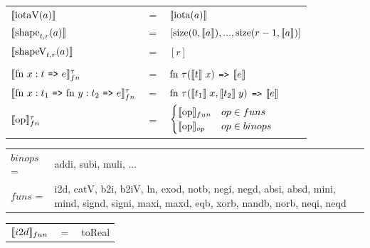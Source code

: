 \documentclass[11pt]{article}
\begin{document}
\begin{flushleft}
\begin{tabular}{@{}l c l}
$\llbracket \text{iotaV}(a) \rrbracket$ & $=$ & $\llbracket \text{iota}(a) \rrbracket$\\

$\llbracket \text{shape}_{t,r}(a) \rrbracket$ & $=$ & $[\text{size}(0,\llbracket a \rrbracket),...,\text{size}(r-1,\llbracket a \rrbracket)]$\\

$\llbracket \text{shapeV}_{t,r}(a) \rrbracket$ & $=$ & $[r]$\\
\\
$\evals{ \text{fn } x:t $ {\tt =>} $ e}^{\tau}_{fn} $ & $=$ & $ \text{fn } \tau (\llbracket t \rrbracket\; x) $ {\tt =>} $ \llbracket e \rrbracket$\\
$\evals{ \text{fn } x:t_1$ {\tt =>} $\text{fn } y:t_2 $ {\tt =>} $ e}^{\tau}_{fn} $ & $=$ & $ \text{fn } \tau (\llbracket t_1 \rrbracket\; x, \llbracket t_2 \rrbracket \; y) $ {\tt =>} $ \llbracket e \rrbracket$\\
$\llbracket \text{op} \rrbracket^{\tau}_{fn}$ & = & $ \begin{cases} \llbracket \text{op} \rrbracket_{fun} & op \in funs \\ \llbracket \text{op} \rrbracket_{op} & op \in binops \end{cases}$
\end{tabular}
\begin{tabu} to \linewidth { l X}
$binops$ =& addi, subi, muli, ...\\
$funs$ =& i2d, catV, b2i, b2iV, ln, exod, notb, negi, negd, absi, absd, mini, mind, signd, signi, maxi, maxd, eqb, xorb,
nandb, norb, neqi, neqd
\end{tabu}
\end{flushleft}
\restoregeometry

\begin{tabular}{l c l}
$\llbracket i2d \rrbracket_{fun}$ & $=$ & toReal\\ 
\end{tabular}\\
\end{document}
